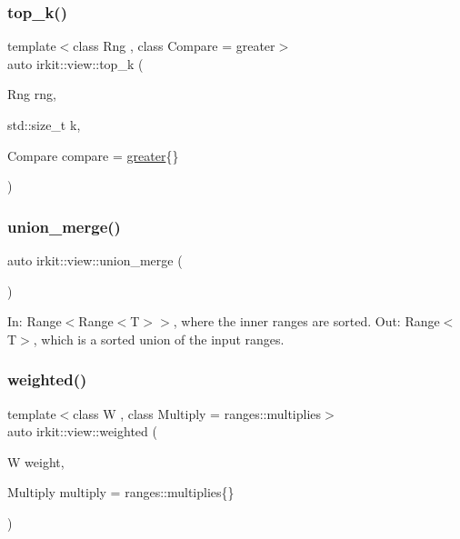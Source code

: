 \subsubsection{\texorpdfstring{top\+\_\+k()}{top\_k()}\hspace{0.1cm}{\footnotesize\ttfamily [2/2]}}
{\footnotesize\ttfamily template$<$class Rng , class Compare  = greater$>$ \\
auto irkit\+::view\+::top\+\_\+k (\begin{DoxyParamCaption}\item[{Rng}]{rng,  }\item[{std\+::size\+\_\+t}]{k,  }\item[{Compare}]{compare = {\ttfamily \mbox{\hyperlink{structirkit_1_1view_1_1greater}{greater}}\{\}} }\end{DoxyParamCaption})}

\mbox{\label{namespaceirkit_1_1view_a45d94ed2030b7535ce266735e3dd49a3}} 
\subsubsection{\texorpdfstring{union\+\_\+merge()}{union\_merge()}}
{\footnotesize\ttfamily auto irkit\+::view\+::union\+\_\+merge (\begin{DoxyParamCaption}{ }\end{DoxyParamCaption})}

In\+: Range$<$Range$<$\+T$>$$>$, where the inner ranges are sorted. Out\+: Range$<$\+T$>$, which is a sorted union of the input ranges. \mbox{\label{namespaceirkit_1_1view_ab3c27d862e946a966c4d7f004407499a}} 
\subsubsection{\texorpdfstring{weighted()}{weighted()}}
{\footnotesize\ttfamily template$<$class W , class Multiply  = ranges\+::multiplies$>$ \\
auto irkit\+::view\+::weighted (\begin{DoxyParamCaption}\item[{W}]{weight,  }\item[{Multiply}]{multiply = {\ttfamily ranges\+:\+:multiplies\{\}} }\end{DoxyParamCaption})}

